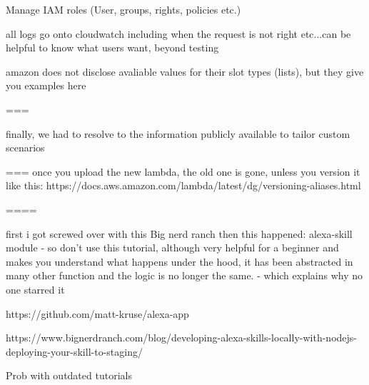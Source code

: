 Manage IAM roles (User, groups, rights, policies etc.)


all logs go onto cloudwatch
including when the request is not right etc...can be helpful to know what users want, beyond testing





amazon does not disclose avaliable values for their slot types (lists), but they give you examples here


===

finally, we had to resolve to the information publicly available to tailor custom scenarios



 ===
once you upload the new lambda, the old one is gone, unless you version it like this:
https://docs.aws.amazon.com/lambda/latest/dg/versioning-aliases.html



====

first i got screwed over with this Big nerd ranch then this happened: alexa-skill module
- so don't use this tutorial, although very helpful for a beginner and makes you understand what happens under the hood, it has been abstracted in many other function and the logic is no longer the same. - which explains why no one starred it

https://github.com/matt-kruse/alexa-app

https://www.bignerdranch.com/blog/developing-alexa-skills-locally-with-nodejs-deploying-your-skill-to-staging/




Prob with outdated tutorials

